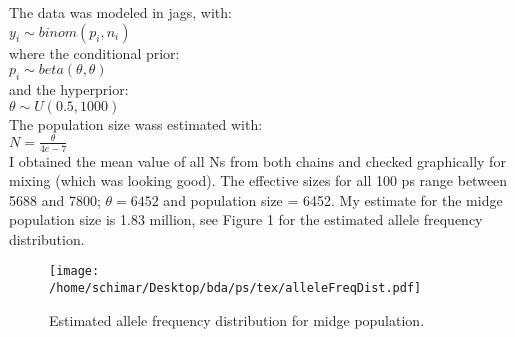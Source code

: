 \documentclass[letterpaper, 12pt]{article}
\begin{document}
\noindent The data was modeled in jags, with: \\
	\indent	$y_{i} \sim binom(p_{i}, n_{i})$ \\
	where the conditional prior:\\
	\indent	$p_{i} \sim beta(\theta, \theta)$ \\
	and the hyperprior:\\
	\indent	$\theta \sim U(0.5, 1000)$ \\
The population size wass estimated with: \\
	\indent $ N = \frac{\theta}{4e-7}$ \\

\noindent I obtained the mean value of all Ns from both chains and checked graphically for mixing (which was looking good). The effective sizes for all 100 ps range between 5688 and 7800; $\theta = 6452$ and population size = 6452. 
My estimate for the midge population size is 1.83 million, see Figure 1 for the estimated allele frequency distribution. 


\begin{figure}[h!]\centering
	\texttt{[image: /home/schimar/Desktop/bda/ps/tex/alleleFreqDist.pdf]}
	\caption{Estimated allele frequency distribution for midge population.}
\end{figure}











\end{document}
